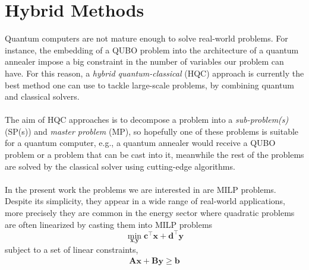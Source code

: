 
\chapter{Hybrid Methods} %

\label{Chapter3} %

Quantum computers are not mature enough to solve real-world problems. For instance, the embedding of a QUBO problem into the architecture of a quantum annealer impose a big constraint in the number of variables our problem can have. For this reason, a \textit{hybrid quantum-classical} (HQC) approach is currently the best method one can use to tackle large-scale problems, by combining quantum and classical solvers.\\\\
The aim of HQC approaches is to decompose a problem into a \textit{sub-problem(s)} (SP(s)) and \textit{master problem} (MP), so hopefully one of these problems is suitable for a quantum computer, e.g., a quantum annealer would receive a QUBO problem or a problem that can be cast into it, meanwhile the rest of the problems are solved by the classical solver using cutting-edge algorithms.\\\\ 
In the present work the problems we are interested in are MILP problems. Despite its simplicity, they appear in a wide range of real-world applications, more precisely they are common in the energy sector where quadratic problems are often linearized by casting them into MILP problems
\begin{equation}
\label{eq: MILP}
    \min_{\textbf{x},\textbf{y}} \textbf{c}^\intercal\textbf{x} + \textbf{d}^\intercal\textbf{y}
\end{equation}
subject to a set of linear constraints,
\begin{align}
    \textbf{A}\textbf{x} + \textbf{B}\textbf{y} \geq \textbf{b}
\end{align}
